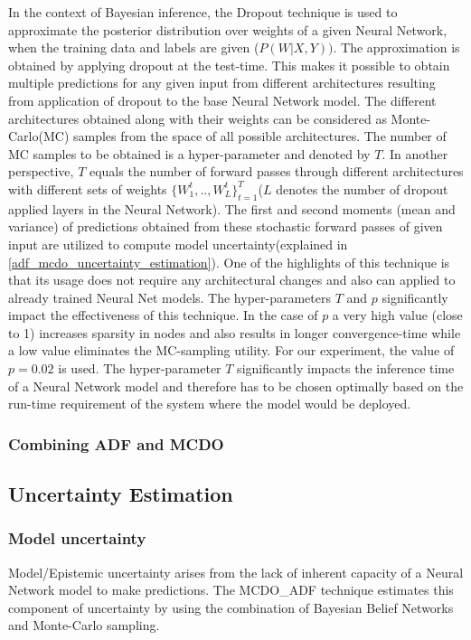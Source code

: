 	In the context of Bayesian inference, the Dropout technique is used to approximate the posterior distribution over weights of a given Neural Network, when the training data and labels are given ($P(W|X,Y))$. The approximation is obtained by applying dropout at the test-time. This makes it possible to obtain multiple predictions for any given input from different architectures resulting from application of dropout to the base Neural Network model. The different architectures obtained along with their weights can be considered as Monte-Carlo(MC) samples from the space of all possible architectures. The number of MC samples to be obtained is a hyper-parameter and denoted by $T$. In another perspective, $T$ equals the number of forward passes through different architectures with different sets of weights $\{W_{1}^t,..,W_{L}^t\}_{t=1}^T$($L$ denotes the number of dropout applied layers in the Neural Network). The first and second moments (mean and variance) of predictions obtained from these stochastic forward passes of given input are utilized to compute model uncertainty(explained in  \ref{adf_mcdo_uncertainty_estimation}). One of the highlights of this technique is that its usage does not require any architectural changes and also can applied to already trained Neural Net models. The hyper-parameters $T$ and $p$ significantly impact the effectiveness of this technique. In the case of $p$ a very high value (close to 1) increases sparsity in nodes and also results in longer convergence-time while a low value eliminates the MC-sampling utility. For our experiment, the value of $p=0.02$ is used. The hyper-parameter $T$ significantly impacts the inference time of a Neural Network model and therefore has to be chosen optimally based on the run-time requirement of the system where the model would be deployed.


	\subsubsection{Combining ADF and MCDO}


    \subsection{Uncertainty Estimation}{\label{adf_mcdo_uncertainty_estimation}}
    \subsubsection{Model uncertainty}
	Model/Epistemic uncertainty arises from the lack of inherent capacity of a Neural Network model to make predictions. The MCDO\_ADF technique estimates this component of uncertainty by using the combination of Bayesian Belief Networks and Monte-Carlo sampling. 
    
